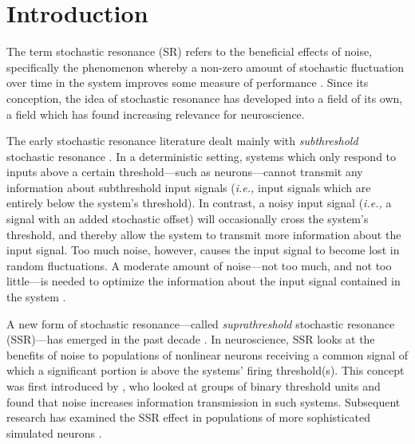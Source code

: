 \documentclass[12pt]{article}
\begin{document}

\section{Introduction}
\label{scn:introduction}

The term stochastic resonance (SR) refers to the beneficial effects of noise, specifically the phenomenon whereby a non-zero amount of stochastic fluctuation over time in the system improves some measure of performance \citep{McDonnell2009}. Since its conception, the idea of stochastic resonance has developed into a field of its own, a field which has found increasing relevance for neuroscience.

The early stochastic resonance literature dealt mainly with \emph{subthreshold} stochastic resonance \citep{Gammaitoni1998}. In a deterministic setting, systems which only respond to inputs above a certain threshold---such as neurons---cannot transmit any information about subthreshold input signals (\emph{i.e.,} input signals which are entirely below the system's threshold). In contrast, a noisy input signal (\emph{i.e.,} a signal with an added stochastic offset) will occasionally cross the system's threshold, and thereby allow the system to transmit more information about the input signal. Too much noise, however, causes the input signal to become lost in random fluctuations. A moderate amount of noise---not too much, and not too little---is needed to optimize the information about the input signal contained in the system \citep{Wiesenfeld1994,Longtin1998}.

A new form of stochastic resonance---called \emph{suprathreshold} stochastic resonance (SSR)---has emerged in the past decade \citep{McDonnell2009,McDonnell2011}. In neuroscience, SSR looks at the benefits of noise to populations of nonlinear neurons receiving a common signal of which a significant portion is above the systems' firing threshold(s). This concept was first introduced by \cite{Stocks2000}, who looked at groups of binary threshold units and found that noise increases information transmission in such systems. Subsequent research has examined the SSR effect in populations of more sophisticated simulated neurons \citep{Stocks2001}.
\end{document}
